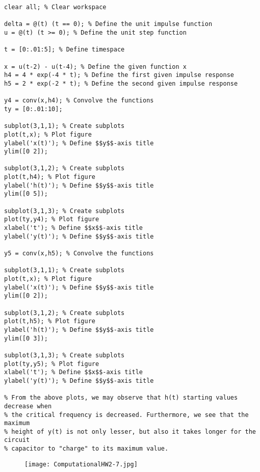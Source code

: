\documentclass[10pt]{article}
\begin{document}
\begin{lstlisting}
clear all; % Clear workspace

delta = @(t) (t == 0); % Define the unit impulse function
u = @(t) (t >= 0); % Define the unit step function

t = [0:.01:5]; % Define timespace

x = u(t-2) - u(t-4); % Define the given function x
h4 = 4 * exp(-4 * t); % Define the first given impulse response
h5 = 2 * exp(-2 * t); % Define the second given impulse response

y4 = conv(x,h4); % Convolve the functions
ty = [0:.01:10];

subplot(3,1,1); % Create subplots
plot(t,x); % Plot figure
ylabel('x(t)'); % Define $$y$$-axis title
ylim([0 2]);

subplot(3,1,2); % Create subplots
plot(t,h4); % Plot figure
ylabel('h(t)'); % Define $$y$$-axis title
ylim([0 5]);

subplot(3,1,3); % Create subplots
plot(ty,y4); % Plot figure
xlabel('t'); % Define $$x$$-axis title
ylabel('y(t)'); % Define $$y$$-axis title

y5 = conv(x,h5); % Convolve the functions

subplot(3,1,1); % Create subplots
plot(t,x); % Plot figure
ylabel('x(t)'); % Define $$y$$-axis title
ylim([0 2]);

subplot(3,1,2); % Create subplots
plot(t,h5); % Plot figure
ylabel('h(t)'); % Define $$y$$-axis title
ylim([0 3]);

subplot(3,1,3); % Create subplots
plot(ty,y5); % Plot figure
xlabel('t'); % Define $$x$$-axis title
ylabel('y(t)'); % Define $$y$$-axis title

% From the above plots, we may observe that h(t) starting values decrease when
% the critical frequency is decreased. Furthermore, we see that the maximum
% height of y(t) is not only lesser, but also it takes longer for the circuit
% capacitor to "charge" to its maximum value.
\end{lstlisting}
\begin{figure}[!ht]
\texttt{[image: ComputationalHW2-7.jpg]}
\end{figure}
\end{document}
